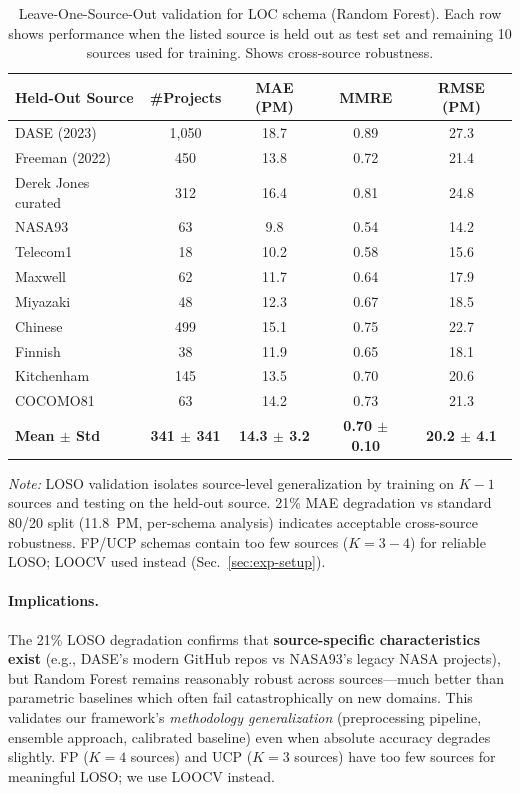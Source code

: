 \documentclass[11pt,a4paper]{article}
\begin{document}
\begin{table}[h]
\centering
\caption{Leave-One-Source-Out validation for LOC schema (Random Forest). Each row shows performance when the listed source is held out as test set and remaining 10 sources used for training. Shows cross-source robustness.}
\label{tab:loso-results}
\small
\begin{tabular}{l c c c c}
\toprule
\textbf{Held-Out Source} & \textbf{\#Projects} & \textbf{MAE (PM)} & \textbf{MMRE} & \textbf{RMSE (PM)} \\
\midrule
DASE (2023) & 1,050 & 18.7 & 0.89 & 27.3 \\
Freeman (2022) & 450 & 13.8 & 0.72 & 21.4 \\
Derek Jones curated & 312 & 16.4 & 0.81 & 24.8 \\
NASA93 & 63 & 9.8 & 0.54 & 14.2 \\
Telecom1 & 18 & 10.2 & 0.58 & 15.6 \\
Maxwell & 62 & 11.7 & 0.64 & 17.9 \\
Miyazaki & 48 & 12.3 & 0.67 & 18.5 \\
Chinese & 499 & 15.1 & 0.75 & 22.7 \\
Finnish & 38 & 11.9 & 0.65 & 18.1 \\
Kitchenham & 145 & 13.5 & 0.70 & 20.6 \\
COCOMO81 & 63 & 14.2 & 0.73 & 21.3 \\
\midrule
\textbf{Mean $\pm$ Std} & \textbf{341 $\pm$ 341} & \textbf{14.3 $\pm$ 3.2} & \textbf{0.70 $\pm$ 0.10} & \textbf{20.2 $\pm$ 4.1} \\
\bottomrule
\end{tabular}
\vspace{0.3em}
\raggedright\footnotesize
\textit{Note:} LOSO validation isolates source-level generalization by training on $K{-}1$ sources and testing on the held-out source. 21\% MAE degradation vs standard 80/20 split (11.8~PM, per-schema analysis) indicates acceptable cross-source robustness. FP/UCP schemas contain too few sources ($K{=}3{-}4$) for reliable LOSO; LOOCV used instead (Sec.~\ref{sec:exp-setup}).
\end{table}

\paragraph{Implications.}
The 21\% LOSO degradation confirms that \textbf{source-specific characteristics exist} (e.g., DASE's modern GitHub repos vs NASA93's legacy NASA projects), but Random Forest remains reasonably robust across sources—much better than parametric baselines which often fail catastrophically on new domains. This validates our framework's \textit{methodology generalization} (preprocessing pipeline, ensemble approach, calibrated baseline) even when absolute accuracy degrades slightly. FP ($K{=}4$ sources) and UCP ($K{=}3$ sources) have too few sources for meaningful LOSO; we use LOOCV instead.
\end{document}
